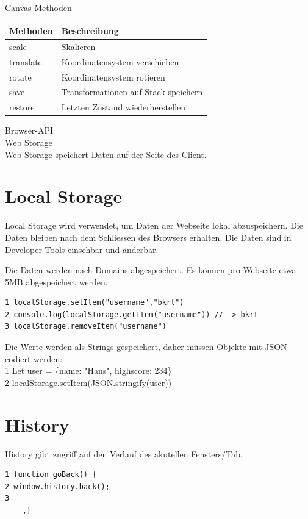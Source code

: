 \documentclass[10pt]{article}
\begin{document}
Canvas Methoden

\begin{center}
\begin{tabular}{|l|l|}
\hline
Methoden & Beschreibung \\
\hline
scale & Skalieren \\
\hline
translate & Koordinatensystem verschieben \\
\hline
rotate & Koordinatensystem rotieren \\
\hline
save & Transformationen auf Stack speichern \\
\hline
restore & Letzten Zustand wiederherstellen \\
\hline
\end{tabular}
\end{center}

Browser-API\\
Web Storage\\
Web Storage speichert Daten auf der Seite des Client.

\section*{Local Storage}
Local Storage wird verwendet, um Daten der Webseite lokal abzuspeichern. Die Daten bleiben nach dem Schliessen des Browsers erhalten. Die Daten sind in Developer Tools einsehbar und änderbar.

Die Daten werden nach Domains abgespeichert. Es können pro Webseite etwa 5MB abgespeichert werden.

\begin{verbatim}
1 localStorage.setItem("username","bkrt")
2 console.log(localStorage.getItem("username")) // -> bkrt
3 localStorage.removeItem("username")
\end{verbatim}

Die Werte werden als Strings gespeichert, daher müssen Objekte mit JSON codiert werden:\\
1 Let user = \{name: "Hans", highscore: 234\}\\
2 localStorage.setItem(JSON.stringify(user))

\section*{History}
History gibt zugriff auf den Verlauf des akutellen Fensters/Tab.

\begin{verbatim}
1 function goBack() {
2 window.history.back();
3
    ,}
\end{verbatim}
\end{document}
